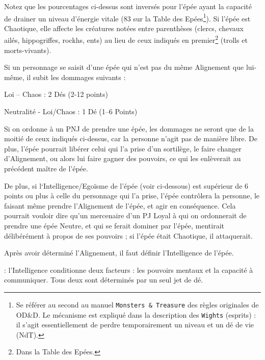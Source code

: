 \documentclass[12pt]{article}
\newcommand{\myunderline}[1]{\underline{\smash{#1}}}
\begin{document}
{{\medskip

Notez que les pourcentages ci-dessus sont inversés pour l'épée ayant la capacité de drainer un niveau d'énergie vitale (83 sur la Table des Epées\footnote
{Se référer au second au manuel \texttt{Monsters \& Treasure} des règles originales de OD\&D. Le mécanisme est expliqué dans la description des \texttt{Wights} (esprits) : il s'agit essentiellement de perdre temporairement un niveau et un dé de vie (NdT).}). Si l'épée est Chaotique, elle affecte les créatures notées entre parenthèses (clercs, chevaux ailés, hippogriffes, rockhs, ents) au lieu de ceux indiqués en premier\footnote{Dans la Table des Epées.} (trolls et morts-vivants).

\medskip

Si un personnage se saisit d'une épée qui n'est pas du même Alignement que lui-même, il subit les dommages suivants :

\medskip

{\parindent2cm Loi -- Chaos : 2 Dés (2-12 points)

Neutralité - Loi/Chaos : 1 Dé (1--6 Points)}

\medskip

Si on ordonne à un PNJ de prendre une épée, les dommages ne seront que de la moitié de ceux indiqués ci-dessus, car la personne n'agit pas de manière libre. De plus, l'épée pourrait libérer celui qui l'a prise d'un sortilège, le faire changer d'Alignement, ou alors lui faire gagner des pouvoirs, ce qui les enlèverait au précédent maître de l'épée.

\medskip

De plus, si l‘Intelligence/Egoïsme de l'épée (voir ci-dessous) est supérieur de 6 points ou plus à celle du personnage qui l'a prise, l'épée contrôlera la personne, le faisant même prendre l'Alignement de l'épée, et agir en conséquence. Cela pourrait vouloir dire qu'un mercenaire d'un PJ Loyal à qui on ordonnerait de prendre une épée Neutre, et qui se ferait dominer par l'épée, mentirait délibérément à propos de ses pouvoirs ; si l'épée était Chaotique, il attaquerait.

\medskip

Après avoir déterminé l'Alignement, il faut définir l'Intelligence de l'épée.

\medskip

\myunderline{Intelligence} : l'Intelligence conditionne deux facteurs : les pouvoirs mentaux et la capacité à communiquer. Tous deux sont déterminés par un seul jet de dé.

}}
\end{document}
